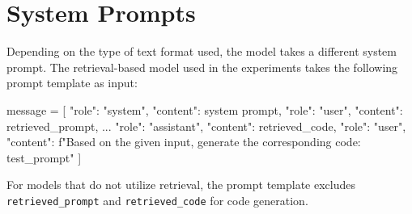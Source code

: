 \section{System Prompts} \label{sec:system_prompt}
Depending on the type of text format used, the model takes a different system prompt. The retrieval-based model used in the experiments takes the following prompt template as input:

\begin{shk}
message = [
    {"role": "system", "content": {system prompt}},
    {"role": "user", "content": retrieved_prompt}, 
    ...
    {"role": "assistant", "content": retrieved_code},
    {"role": "user", "content": f"Based on the given input, generate the corresponding code: {test_prompt}"}
]
\end{shk}
\noindent\begin{minipage}{\textwidth}
\captionsetup{type=figure}
\end{minipage}
For models that do not utilize retrieval, the prompt template excludes \texttt{retrieved\_prompt} and \texttt{retrieved\_code} for code generation.


